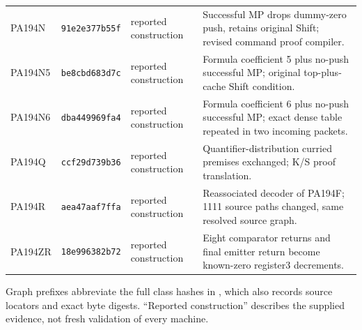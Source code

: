 \begin{longtable}{@{}p{.20\linewidth} p{.15\linewidth} p{.13\linewidth} p{.43\linewidth}@{}}
PA194N & \texttt{91e2e377b55f} & reported construction & Successful MP drops dummy-zero push, retains original Shift; revised command proof compiler.\\[4pt]
PA194N5 & \texttt{be8cbd683d7c} & reported construction & Formula coefficient 5 plus no-push successful MP; original top-plus-cache Shift condition.\\[4pt]
PA194N6 & \texttt{dba449969fa4} & reported construction & Formula coefficient 6 plus no-push successful MP; exact dense table repeated in two incoming packets.\\[4pt]
PA194Q & \texttt{ccf29d739b36} & reported construction & Quantifier-distribution curried premises exchanged; K/S proof translation.\\[4pt]
PA194R & \texttt{aea47aaf7ffa} & reported construction & Reassociated decoder of PA194F; 1111 source paths changed, same resolved source graph.\\[4pt]
PA194ZR & \texttt{18e996382b72} & reported construction & Eight comparator returns and final emitter return become known-zero register3 decrements.\\[4pt]
\bottomrule\end{longtable}\endgroup
Graph prefixes abbreviate the full class hashes in , which also records source locators and exact byte digests. ``Reported construction'' describes the supplied evidence, not fresh validation of every machine.
